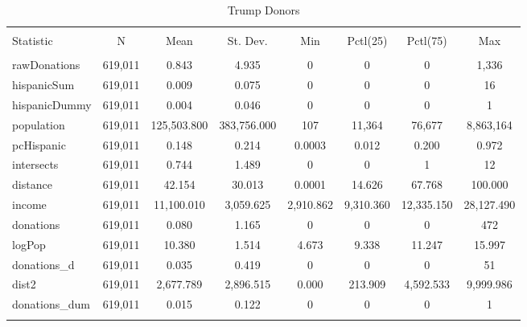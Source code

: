 
\begin{table}[!htbp] \centering 
  \caption{Trump Donors} 
  \label{} 
\scriptsize 
\begin{tabular}{@{\extracolsep{5pt}}lccccccc} 
\\[-1.8ex]\hline 
\hline \\[-1.8ex] 
Statistic & \multicolumn{1}{c}{N} & \multicolumn{1}{c}{Mean} & \multicolumn{1}{c}{St. Dev.} & \multicolumn{1}{c}{Min} & \multicolumn{1}{c}{Pctl(25)} & \multicolumn{1}{c}{Pctl(75)} & \multicolumn{1}{c}{Max} \\ 
\hline \\[-1.8ex] 
rawDonations & 619,011 & 0.843 & 4.935 & 0 & 0 & 0 & 1,336 \\ 
hispanicSum & 619,011 & 0.009 & 0.075 & 0 & 0 & 0 & 16 \\ 
hispanicDummy & 619,011 & 0.004 & 0.046 & 0 & 0 & 0 & 1 \\ 
population & 619,011 & 125,503.800 & 383,756.000 & 107 & 11,364 & 76,677 & 8,863,164 \\ 
pcHispanic & 619,011 & 0.148 & 0.214 & 0.0003 & 0.012 & 0.200 & 0.972 \\ 
intersects & 619,011 & 0.744 & 1.489 & 0 & 0 & 1 & 12 \\ 
distance & 619,011 & 42.154 & 30.013 & 0.0001 & 14.626 & 67.768 & 100.000 \\ 
income & 619,011 & 11,100.010 & 3,059.625 & 2,910.862 & 9,310.360 & 12,335.150 & 28,127.490 \\ 
donations & 619,011 & 0.080 & 1.165 & 0 & 0 & 0 & 472 \\ 
logPop & 619,011 & 10.380 & 1.514 & 4.673 & 9.338 & 11.247 & 15.997 \\ 
donations\_d & 619,011 & 0.035 & 0.419 & 0 & 0 & 0 & 51 \\ 
dist2 & 619,011 & 2,677.789 & 2,896.515 & 0.000 & 213.909 & 4,592.533 & 9,999.986 \\ 
donations\_dum & 619,011 & 0.015 & 0.122 & 0 & 0 & 0 & 1 \\ 
\hline \\[-1.8ex] 
\end{tabular} 
\end{table} 

